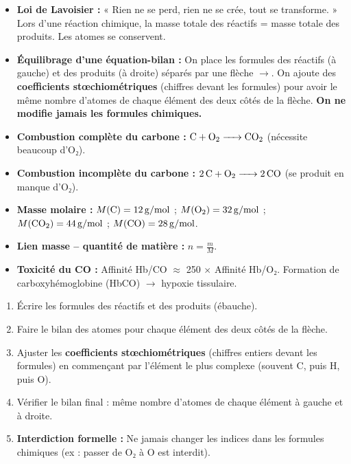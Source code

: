 \documentclass[11pt]{article}
\newcounter{popsec}
\newcounter{popsub}
\newcommand{\courssub}[1]{%
  \stepcounter{popsub}%
  \par\vspace{9pt}\noindent{\popxbold\fontsize{11.5}{13}\selectfont\color{popink}{\color{poporange}\thepopsec.\thepopsub}\hspace{6pt}#1}\par\nopagebreak\vspace{4pt}
}
\begin{document}
\courssub{Ressources à mobiliser}
\begin{aretenir}
    \begin{itemize}
        \item \textbf{Loi de Lavoisier :} « Rien ne se perd, rien ne se crée, tout se transforme. » Lors d'une réaction chimique, la masse totale des réactifs = masse totale des produits. Les atomes se conservent.
        \item \textbf{Équilibrage d'une équation-bilan :} On place les formules des réactifs (à gauche) et des produits (à droite) séparés par une flèche $\rightarrow$. On ajoute des \textbf{coefficients stœchiométriques} (chiffres devant les formules) pour avoir le même nombre d'atomes de chaque élément des deux côtés de la flèche. \textbf{On ne modifie jamais les formules chimiques.}
        \item \textbf{Combustion complète du carbone :} $\ce{C + O2 -> CO2}$ (nécessite beaucoup d'O₂).
        \item \textbf{Combustion incomplète du carbone :} $\ce{2C + O2 -> 2CO}$ (se produit en manque d'O₂).
        \item \textbf{Masse molaire :} $M(\ce{C}) = \SI{12}{g/mol}$ ; $M(\ce{O2}) = \SI{32}{g/mol}$ ; $M(\ce{CO2}) = \SI{44}{g/mol}$ ; $M(\ce{CO}) = \SI{28}{g/mol}$.
        \item \textbf{Lien masse -- quantité de matière :} $n = \frac{m}{M}$.
        \item \textbf{Toxicité du CO :} Affinité Hb/CO $\approx$ 250 $\times$ Affinité Hb/O₂. Formation de carboxyhémoglobine (HbCO) $\rightarrow$ hypoxie tissulaire.
    \end{itemize}
\end{aretenir}

\begin{methode}
\begin{enumerate}
    \item Écrire les formules des réactifs et des produits (ébauche).
    \item Faire le bilan des atomes pour chaque élément des deux côtés de la flèche.
    \item Ajuster les \textbf{coefficients stœchiométriques} (chiffres entiers devant les formules) en commençant par l'élément le plus complexe (souvent C, puis H, puis O).
    \item Vérifier le bilan final : même nombre d'atomes de chaque élément à gauche et à droite.
    \item \textbf{Interdiction formelle :} Ne jamais changer les indices dans les formules chimiques (ex : passer de O₂ à O est interdit).
\end{enumerate}
\end{methode}
\end{document}
